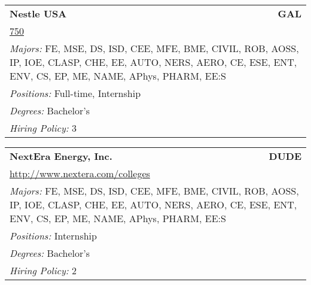 \documentclass[twoside]{article}
\begin{document}
\begin{center}
\begin{multicols}{3}
\begin{FlushLeft}
\begin{minipage}{.9\columnwidth}
\end{minipage}
 
\begin{minipage}{.9\columnwidth}\begin{tabularx}{.95\columnwidth}{Xr}
                 {\Large\bf Nestle USA} & {\Large\bf GAL}\\
    \multicolumn{2}{p{.95\columnwidth}}{\url{750}}\\
    \multicolumn{2}{p{.95\columnwidth}}{\emph{Majors:} FE, MSE, DS, ISD, CEE, MFE, BME, CIVIL, ROB, AOSS, IP, IOE, CLASP, CHE, EE, AUTO, NERS, AERO, CE, ESE, ENT, ENV, CS, EP, ME, NAME, APhys, PHARM, EE:S}\\
    \multicolumn{2}{p{.95\columnwidth}}{\emph{Positions:} Full-time, Internship}\\
    \multicolumn{2}{p{.95\columnwidth}}{\emph{Degrees:} Bachelor's}\\
    \multicolumn{2}{p{.95\columnwidth}}{\emph{Hiring Policy:} 3}\\
    \end{tabularx}
    
\end{minipage}
 
\begin{minipage}{.9\columnwidth}\begin{tabularx}{.95\columnwidth}{Xr}
                 {\Large\bf NextEra Energy, Inc.} & {\Large\bf DUDE}\\
    \multicolumn{2}{p{.95\columnwidth}}{\url{http://www.nextera.com/colleges}}\\
    \multicolumn{2}{p{.95\columnwidth}}{\emph{Majors:} FE, MSE, DS, ISD, CEE, MFE, BME, CIVIL, ROB, AOSS, IP, IOE, CLASP, CHE, EE, AUTO, NERS, AERO, CE, ESE, ENT, ENV, CS, EP, ME, NAME, APhys, PHARM, EE:S}\\
    \multicolumn{2}{p{.95\columnwidth}}{\emph{Positions:} Internship}\\
    \multicolumn{2}{p{.95\columnwidth}}{\emph{Degrees:} Bachelor's}\\
    \multicolumn{2}{p{.95\columnwidth}}{\emph{Hiring Policy:} 2}\\
    \end{tabularx}
    
\end{minipage}
 

\end{FlushLeft}
\end{multicols}
\end{center}
\end{document}
